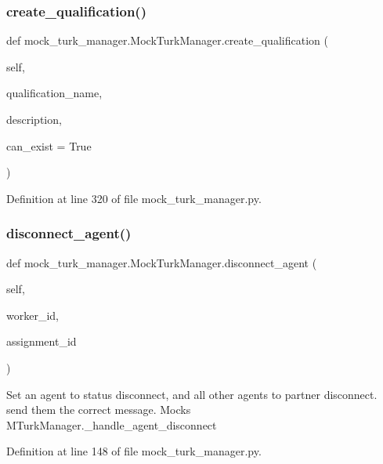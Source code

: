\subsubsection{\texorpdfstring{create\+\_\+qualification()}{create\_qualification()}}
{\footnotesize\ttfamily def mock\+\_\+turk\+\_\+manager.\+Mock\+Turk\+Manager.\+create\+\_\+qualification (\begin{DoxyParamCaption}\item[{}]{self,  }\item[{}]{qualification\+\_\+name,  }\item[{}]{description,  }\item[{}]{can\+\_\+exist = {\ttfamily True} }\end{DoxyParamCaption})}



Definition at line 320 of file mock\+\_\+turk\+\_\+manager.\+py.

\mbox{\label{classmock__turk__manager_1_1MockTurkManager_acbbf88a9423e37ee24ffb34f4ae4dd23}} 
\subsubsection{\texorpdfstring{disconnect\+\_\+agent()}{disconnect\_agent()}}
{\footnotesize\ttfamily def mock\+\_\+turk\+\_\+manager.\+Mock\+Turk\+Manager.\+disconnect\+\_\+agent (\begin{DoxyParamCaption}\item[{}]{self,  }\item[{}]{worker\+\_\+id,  }\item[{}]{assignment\+\_\+id }\end{DoxyParamCaption})}

\begin{DoxyVerb}Set an agent to status disconnect, and all other agents to
partner disconnect. send them the correct message. Mocks
MTurkManager._handle_agent_disconnect
\end{DoxyVerb}
 

Definition at line 148 of file mock\+\_\+turk\+\_\+manager.\+py.



